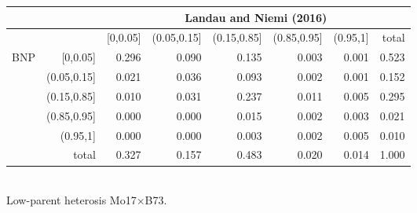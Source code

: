 \begin{table}[ht]
   \begin{tabular}{rrrrrrr|r}
&  &\multicolumn{6}{c}{Landau and Niemi (2016)}\\
  \toprule
&  & [0,0.05] & (0.05,0.15] & (0.15,0.85] & (0.85,0.95] & (0.95,1] & total \\
  \midrule
\multirow{6}{*}{BNP} & [0,0.05] & 0.296 & 0.090 & 0.135 & 0.003 & 0.001 & 0.523 \\
                     & (0.05,0.15] & 0.021 & 0.036 & 0.093 & 0.002 & 0.001 & 0.152 \\
                     & (0.15,0.85] & 0.010 & 0.031 & 0.237 & 0.011 & 0.005 & 0.295 \\
                     & (0.85,0.95] & 0.000 & 0.000 & 0.015 & 0.002 & 0.003 & 0.021 \\
                     & (0.95,1] & 0.000 & 0.000 & 0.003 & 0.002 & 0.005 & 0.010 \\
                     \midrule
                     & total & 0.327 & 0.157 & 0.483 & 0.020 & 0.014 & 1.000 \\
   \bottomrule
\end{tabular}
\\[.5cm]
Low-parent heterosis Mo17$\times$B73.
\end{table}

